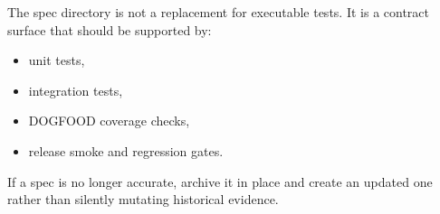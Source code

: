 The spec directory is not a replacement for executable tests. It is a contract surface that should be supported by:

\begin{itemize}
\tightlist
\item
  unit tests,
\item
  integration tests,
\item
  DOGFOOD coverage checks,
\item
  release smoke and regression gates.
\end{itemize}

If a spec is no longer accurate, archive it in place and create an updated one rather than silently mutating historical evidence.


